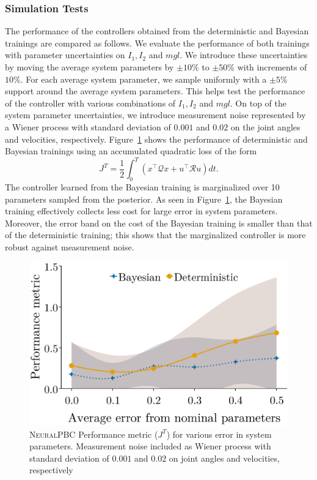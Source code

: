 \subsubsection{Simulation Tests} 
The performance of the controllers obtained from the deterministic and Bayesian
trainings are compared as follows.
%
We evaluate the performance of both trainings with parameter uncertainties
on $I_1, I_2$ and $mgl$. 
%
We introduce these uncertainties by moving the average
system parameters by $\pm 10\%$ to $\pm 50\%$ with increments of $10\%$. 
%
For each average system parameter, we sample uniformly with a $\pm 5\%$ support
around the average system parameters. 
%
This helps test the performance of the controller with various combinations of
$I_1, I_2$ and $mgl$.
%
On top of the system parameter uncertainties, we introduce measurement noise
represented by a Wiener process with standard deviation of $0.001$ and $0.02$ on
the joint angles and velocities, respectively. 
%
Figure~\ref{fig:comparison_neuralpbc} shows the performance of deterministic and
Bayesian trainings using an accumulated quadratic loss of the form
\begin{equation} J^T = \frac{1}{2}\int_0^T \left(x^\top \mathcal{Q}x + u^\top \mathcal{R}u \right) dt.
\label{eq:performance_metric} \end{equation}
%
The controller learned from the Bayesian training is marginalized over 10
parameters sampled from the posterior.
As seen in Figure~\ref{fig:comparison_neuralpbc}, the Bayesian training
effectively collects less cost for large error in system parameters.
%
Moreover, the error band on the cost of the Bayesian training is smaller than
that of the deterministic training; this shows that the marginalized controller
is more robust against measurement noise.
%   
\begin{figure}[tb]
    \centering
    \includegraphics[clip,width=0.7\linewidth]{./figures/bandplot2.eps}%
    \caption{\textsc{NeuralPBC} Performance metric ($J^T$) for various
    error in system parameters. Measurement noise included as Wiener process
    with standard deviation of $0.001$ and $0.02$ on joint angles and
    velocities, respectively}
    \label{fig:comparison_neuralpbc}
\end{figure}

